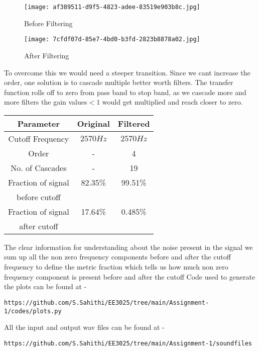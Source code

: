 \documentclass[journal,12pt,twocolumn]{IEEEtran}
\begin{document}
\captionsetup[figure]{label format=empty}
\begin{figure}[H]
\centering
\texttt{[image: af389511-d9f5-4823-adee-83519e903b8c.jpg]}
\caption{Before Filtering}
\label{fig:Figure0}
\texttt{[image: 7cfdf07d-85e7-4bd0-b3fd-2823b8878a02.jpg]}
\caption{After Filtering}
\label{fig:Figure1}
\end{figure}
    To overcome this we would need a steeper transition. Since we cant increase the order, one solution is to cascade multiple better worth filters. The transfer function rolls off to zero from pass band to stop band, as we cascade more and more filters the gain values$<1$ would get multiplied and reach closer to zero.
\begin{center}
\begin{tabular}{ |c|c|c| } 
 \hline
 Parameter & Original & Filtered\\
 \hline
 Cutoff Frequency & $2570Hz$ & $2570 Hz$\\ 
 \hline
 Order & - & 4\\ 
 \hline
No. of Cascades & - & 19\\ 
 \hline
Fraction of signal & 82.35\% & 99.51\%\\
before cutoff & & &\\
\hline
Fraction of signal  & 17.64\% & 0.485\%\\
after cutoff & & &\\
\hline
\end{tabular}
\end{center}
The clear information for understanding about the  noise present in the signal we sum up all the non zero frequency
components before and after the cutoff frequency to define the metric fraction which tells us how much non zero frequency component is present before and after the cutoff
Code used to generate the plots can be found at - 
\begin{lstlisting}
https://github.com/S.Sahithi/EE3025/tree/main/Assignment-1/codes/plots.py
\end{lstlisting}
All the input and output wav files can be found at -
\begin{lstlisting}
https://github.com/S.Sahithi/EE3025/tree/main/Assignment-1/soundfiles
\end{lstlisting}
\end{document}
